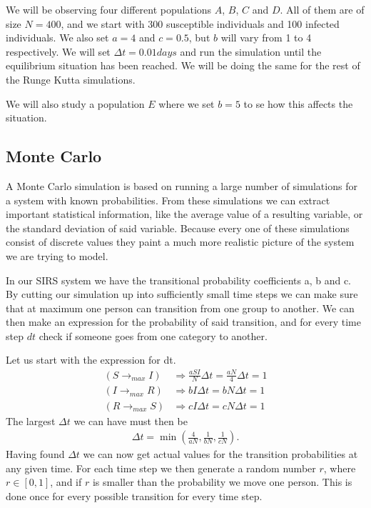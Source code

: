 \documentclass[a4paper]{article}
\let\Oldsubsection\subsection
\renewcommand{\subsection}{\FloatBarrier\Oldsubsection}
\begin{document}
	We will be observing four different populations $A$, $B$, $C$ and $D$. All of them are of size $N = 400$, and we start with 300 susceptible individuals and 100 infected individuals. We also set $a=4$ and $c=0.5$, but $b$ will vary from 1 to 4 respectively. We will set $\Delta t = 0.01 days$ and run the simulation until the equilibrium situation has been reached. We will be doing the same for the rest of the Runge Kutta simulations.
	
	We will also study a population $E$ where we set $b=5$ to se how this affects the situation. 
	
	
	\subsection{Monte Carlo}
	A Monte Carlo simulation is based on running a large number of simulations for a system with known probabilities. From these simulations we can extract important statistical information, like the average value of a resulting variable, or the standard deviation of said variable. Because every one of these simulations consist of discrete values they paint a much more realistic picture of the system we are trying to model.
	
	In our SIRS system we have the transitional probability coefficients a, b and c. By cutting our simulation up into sufficiently small time steps we can make sure that at maximum one person can transition from one group to another. We can then make an expression for the probability of said transition, and for every time step $dt$ check if someone goes from one category to another.
	
	Let us start with the expression for dt.
	\begin{align}
	(S\rightarrow_{max} I) &\Rightarrow \frac{aSI}{N}\Delta t = \frac{aN}{4}\Delta t = 1\\
	(I\rightarrow_{max} R) &\Rightarrow bI\Delta t = bN\Delta t = 1\\
	(R\rightarrow_{max} S) &\Rightarrow cI\Delta t = cN\Delta t = 1
	\end{align}
	The largest $\Delta t$ we can have must then be
	\begin{align}
	\Delta t = \min \left( \frac{4}{aN}, \frac{1}{bN}, \frac{1}{cN}\right).
	\end{align}
	Having found $\Delta t$ we can now get actual values for the transition probabilities at any given time. For each time step we then generate a random number $r$, where $r \in [0, 1]$, and if $r$ is smaller than the probability we move one person. This is done once for every possible transition for every time step.
	
\end{document}
